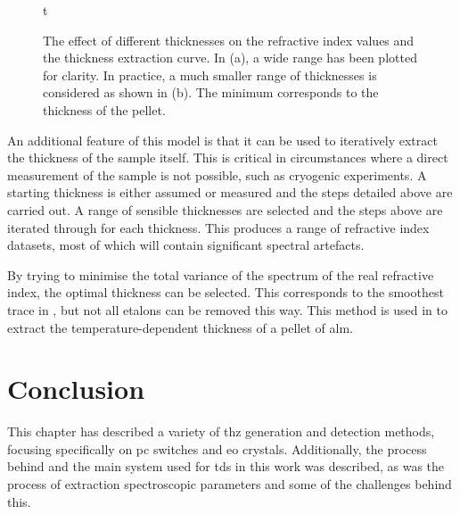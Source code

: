 \begin{figure}{t}
\captionsetup{font = footnotesize, justification = centering}
\caption[The Effect of Different Thicknesses on the Refractive Index Values and the Thickness Extraction Curve]{The effect of different thicknesses on the refractive index values and the thickness extraction curve. In (a), a wide range has been plotted for clarity. In practice, a much smaller range of thicknesses is considered as shown in (b). The minimum corresponds to the thickness of the pellet.}
\label{Fig:thickness}
\end{figure}

An additional feature of this model is that it can be used to iteratively extract the thickness of the sample itself. This is critical in circumstances where a direct measurement of the sample is not possible, such as cryogenic experiments. A starting thickness is either assumed or measured and the steps detailed above are carried out. A range of sensible thicknesses are selected and the steps above are iterated through for each thickness. This produces a range of refractive index datasets, most of which will contain significant spectral artefacts.

By trying to minimise the total variance of the spectrum of the real refractive index, the optimal thickness can be selected. This corresponds to the smoothest trace in , but not all etalons can be removed this way. This method is used in  to extract the temperature\nobreakdash-dependent thickness of a pellet of \acrshort{alm}.

\section{Conclusion}
This chapter has described a variety of \acrshort{thz} generation and detection methods, focusing specifically on \acrshort{pc} switches and \acrshort{eo} crystals. Additionally, the process behind and the main system used for \acrshort{tds} in this work was described, as was the process of extraction spectroscopic parameters and some of the challenges behind this. 
